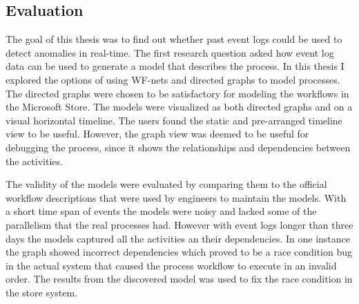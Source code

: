\subsection{Evaluation}
\label{sec:evaluation}




The goal of this thesis was to find out whether past event logs could be used to detect anomalies in real-time. 
The first research question asked how event log data can be used to generate a model that describes the process.
In this thesis I explored the options of using WF-nets and directed graphs to model processes.
The directed graphs were chosen to be satisfactory for modeling the workflows in the Microsoft Store.
The models were visualized as both directed graphs and on a visual horizontal timeline.
The users found the static and pre-arranged timeline view to be useful. 
However, the graph view was deemed to be useful for debugging the process, since it shows the relationships and dependencies between the activities.

The validity of the models were evaluated by comparing them to the official workflow descriptions that were used by engineers to maintain the models. 
With a short time span of events the models were noisy and lacked some of the parallelism that the real processes had.
However with event logs longer than three days the models captured all the activities an their dependencies.
In one instance the graph showed incorrect dependencies which proved to be a race condition bug in the actual system that caused the process workflow to execute in an invalid order.
The results from the discovered model was used to fix the race condition in the store system.

